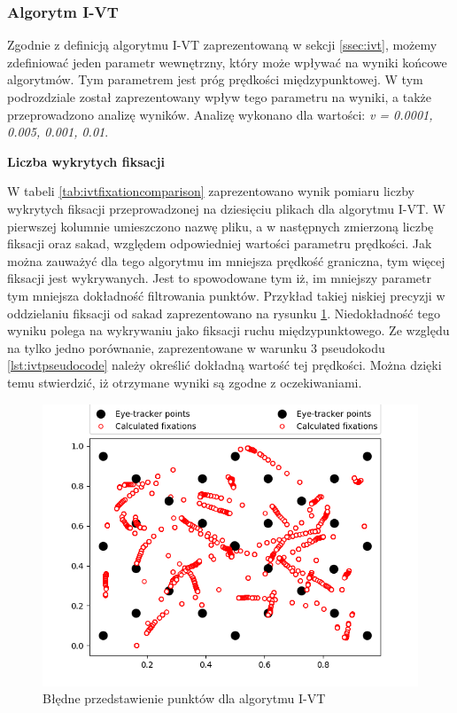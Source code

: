 \subsubsection{Algorytm I-VT}
\label{sssec:ivtresults}
Zgodnie z definicją algorytmu I-VT zaprezentowaną w sekcji \ref{ssec:ivt}, możemy zdefiniować jeden parametr wewnętrzny, który może wpływać na wyniki końcowe algorytmów. Tym parametrem jest próg prędkości międzypunktowej. W tym podrozdziale został zaprezentowany wpływ tego parametru na wyniki, a także przeprowadzono analizę wyników. Analizę wykonano dla wartości: \emph{v = 0.0001, 0.005, 0.001, 0.01}. \par
\textbf{Liczba wykrytych fiksacji}\par
W tabeli \ref{tab:ivtfixationcomparison} zaprezentowano wynik pomiaru liczby wykrytych fiksacji przeprowadzonej na dziesięciu plikach dla algorytmu I-VT. W pierwszej kolumnie umieszczono nazwę pliku, a w następnych zmierzoną liczbę fiksacji oraz sakad, względem odpowiedniej wartości parametru prędkości.
Jak można zauważyć dla tego algorytmu im mniejsza prędkość graniczna, tym więcej fiksacji jest wykrywanych. Jest to spowodowane tym iż, im mniejszy parametr tym mniejsza dokładność filtrowania punktów. Przykład takiej niskiej precyzji w oddzielaniu fiksacji od sakad zaprezentowano na rysunku \ref{fig:ivterrorresults}. Niedokładność tego wyniku polega na wykrywaniu jako fiksacji ruchu międzypunktowego. Ze względu na tylko jedno porównanie, zaprezentowane w warunku 3 pseudokodu \ref{lst:ivtpseudocode} należy określić dokładną wartość tej prędkości. Można dzięki temu stwierdzić, iż otrzymane wyniki są zgodne z oczekiwaniami.\par
\begin{figure}[H]
    \centering
    \captionsetup{justification=centering,margin=2cm}
    \includegraphics[width=\linewidth]{resources/ivt-errorresults.png}
    \caption{Błędne przedstawienie punktów dla algorytmu I-VT}
    \label{fig:ivterrorresults}
\end{figure}

